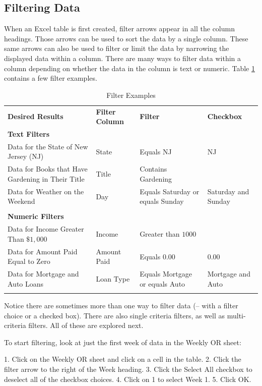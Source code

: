 \subsection{Filtering Data}

When an Excel table is first created, filter arrows appear in all the column headings. Those arrows can be used to sort the data by a single column. These same arrows can also be used to filter or limit the data by narrowing the displayed data within a column. There are many ways to filter data within a column depending on whether the data in the column is text or numeric. Table \ref{05:tab05} contains a few filter examples.

{\fontsize{8}{10} \selectfont
	\begin{longtable}{p{1.5in}p{0.75in}p{1.0in}p{0.75in}} %
		\textbf{Desired Results} & \textbf{Filter Column} & \textbf{Filter} & \textbf{Checkbox} \endhead
		\hline \\
		\multicolumn{4}{l}{\textbf{Text Filters}} \\
		Data for the State of New Jersey (NJ) & State & Equals NJ & NJ \\
		Data for Books that Have Gardening in Their Title & Title & Contains Gardening & \\
		Data for Weather on the Weekend & Day & Equals Saturday or equals Sunday & Saturday and Sunday \\
		\hline \\
		\multicolumn{4}{l}{\textbf{Numeric Filters}} \\
		Data for Income Greater Than $ \$1,000 $ & Income & Greater than $ 1000 $ & \\
		Data for Amount Paid Equal to Zero & Amount Paid & Equals 0.00 & 0.00 \\
		Data for Mortgage and Auto Loans & Loan Type & Equals Mortgage or equals Auto & Mortgage and Auto \\
		\caption{Filter Examples}
		\label{05:tab05}
	\end{longtable}
}


Notice there are sometimes more than one way to filter data (\ie – with a filter choice or a checked box). There are also single criteria filters, as well as multi-criteria filters. All of these are explored next.

To start filtering, look at just the first week of data in the Weekly OR sheet:

1.    Click on the Weekly OR sheet and click on a cell in the table.
2.    Click the filter arrow to the right of the Week heading.
3.    Click the Select All checkbox to deselect all of the checkbox choices.
4.    Click on 1 to select Week 1.
5.    Click OK.

